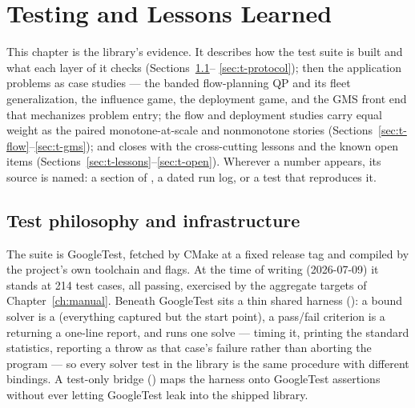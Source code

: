 \chapter{Testing and Lessons Learned}
\label{ch:testing}

This chapter is the library's evidence. It describes how the test suite is
built and what each layer of it checks (Sections~\ref{sec:t-infra}--%
\ref{sec:t-protocol}); then the application problems as case studies ---
the banded flow-planning QP and its fleet generalization, the influence
game, the deployment game, and the GMS front end that mechanizes problem
entry; the flow and deployment studies carry equal
weight as the paired monotone-at-scale and nonmonotone stories
(Sections~\ref{sec:t-flow}--\ref{sec:t-gms}); and
closes with the cross-cutting lessons and the known open items
(Sections~\ref{sec:t-lessons}--\ref{sec:t-open}). Wherever a number
appears, its source is named: a section of
, a dated run log, or a test that
reproduces it.

\section{Test philosophy and infrastructure}
\label{sec:t-infra}

The suite is GoogleTest, fetched by CMake  at a fixed
release tag and compiled by the project's own toolchain and flags. At the
time of writing (2026-07-09) it stands at 214 test cases, all passing,
exercised by the aggregate targets of Chapter~\ref{ch:manual}. Beneath GoogleTest sits a
thin shared harness (): a bound solver is a
 (everything captured but the start point), a pass/fail
criterion is a  returning a one-line report, and
 runs one solve --- timing it, printing the standard
statistics, reporting a throw as that case's failure rather than aborting
the program --- so every solver test in the library is the same procedure
with different bindings. A test-only bridge () maps
the harness onto GoogleTest assertions without ever letting GoogleTest leak
into the shipped library.

